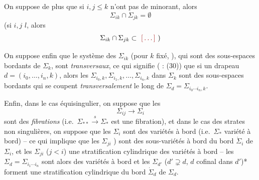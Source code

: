\documentclass[11pt,a4paper]{article}
\begin{document}
On suppose de plus que si $i,j\le k$  n'ont pas de minorant, alors
\[
\Sigma_{ik}\cap\Sigma_{jk}=\emptyset
\]
 (si $i,j$   $l$, alors
\[
\Sigma_{ik}\cap\Sigma_{jk}\subset\ \ill{}\ )
\]


On suppose enfin que le système des $\Sigma_{ik}$ (pour $k$ fixé, ), qui sont des sous-espaces  bordants de $\Sigma_k$, sont \emph{transversaux},  ce qui signifie ( : (30)) que si  un drapeau $d=(i_0,\ldots,i_n,k)$, alors les $\Sigma_{i_0,k},\Sigma_{i_1,k},\ldots,\Sigma_{i_n,k}$ dans $\Sigma_k$ sont des sous-espaces bordants qui se coupent \emph{transversalement} le long de $\Sigma_d=\Sigma_{i_0\cdots i_n,k}$.



Enfin, dans le cas   équisingulier, on suppose que les
\[
\Sigma_{ij}\longrightarrow\Sigma_i
\]
 sont des \emph{fibrations} (i.e.\ $\Sigma_{**}\xrightarrow{\ s\ }\Sigma_{*}$ est une fibration), et dans le cas des strates \struck{\ill{}} non singulières, on suppose que les $\Sigma_i$ sont des variétés à bord (i.e.\ $\Sigma_{*}$ variété à bord) -- ce qui implique que les $\Sigma_{ji}$  ) sont des sous-variétés à bord du  bord $\dot\Sigma_i$ de $\Sigma_i$, et les $\Sigma_{ji}$ ($j<i$)   une stratification cylindrique des variétés à bord --  les $\Sigma_d=\Sigma_{i_1\cdots i_n}$ sont alors des variétés à bord et les $\Sigma_{d'}$ ($d'\supsetneq d$, $d$ cofinal dans $d'$)* \struck{\ill{}} forment une stratification cylindrique du bord $\dot\Sigma_d$ de $\Sigma_d$.
\end{document}

